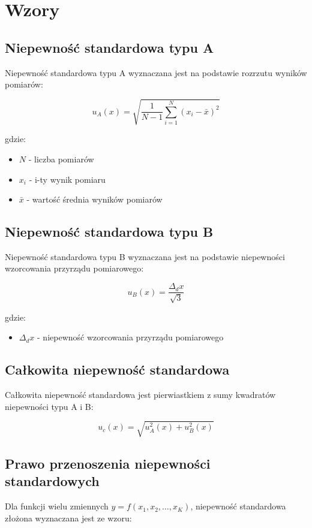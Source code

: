 \documentclass[a4paper,12pt]{article}
\begin{document}
\section{Wzory}

\subsection{Niepewność standardowa typu A}
Niepewność standardowa typu A wyznaczana jest na podstawie rozrzutu wyników pomiarów:

\begin{equation}
    u_A(x) = \sqrt{\frac{1}{N-1} \sum_{i=1}^{N} (x_i - \bar{x})^2}
\end{equation}

gdzie:
\begin{itemize}
    \item $N$ - liczba pomiarów
    \item $x_i$ - i-ty wynik pomiaru
    \item $\bar{x}$ - wartość średnia wyników pomiarów
\end{itemize}

\subsection{Niepewność standardowa typu B}
Niepewność standardowa typu B wyznaczana jest na podstawie niepewności wzorcowania przyrządu pomiarowego:

\begin{equation}
    u_B(x) = \frac{\Delta_d x}{\sqrt{3}}
\end{equation}

gdzie:
\begin{itemize}
    \item $\Delta_d x$ - niepewność wzorcowania przyrządu pomiarowego
\end{itemize}

\subsection{Całkowita niepewność standardowa}
Całkowita niepewność standardowa jest pierwiastkiem z sumy kwadratów niepewności typu A i B:

\begin{equation}
    u_c(x) = \sqrt{u_A^2(x) + u_B^2(x)}
\end{equation}

\subsection{Prawo przenoszenia niepewności standardowych}
Dla funkcji wielu zmiennych $y = f(x_1, x_2, \ldots, x_K)$, niepewność standardowa złożona wyznaczana jest ze wzoru:
\end{document}
